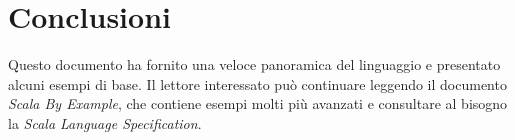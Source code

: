 \section{Conclusioni}
\label{sec:conclusion}

Questo documento ha fornito una veloce panoramica del linguaggio \Scala e presentato alcuni esempi di base. Il lettore interessato pu\`o continuare leggendo il documento \textit{Scala By Example\/}, che contiene esempi molti pi\`u avanzati e consultare al bisogno la \textit{Scala Language Specification\/}.
